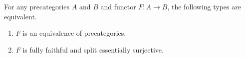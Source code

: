 %
\begin{lem}\label{ct:ffeso}
  For any precategories $A$ and $B$ and functor $F:A\to B$, the following types are equivalent.
  \begin{enumerate}
  \item $F$ is an equivalence of precategories.\label{item:ct:ffeso1}
  \item $F$ is fully faithful and split essentially surjective.\label{item:ct:ffeso2}
  \end{enumerate}
\end{lem}

